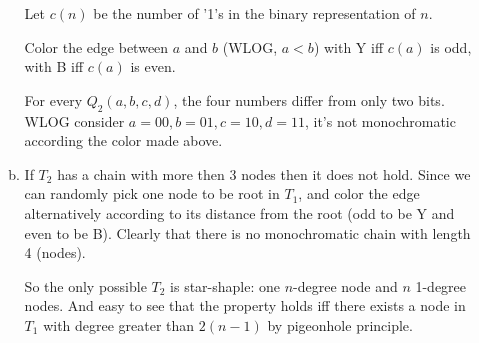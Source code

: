 \documentclass{article}
\begin{document}
\begin{itemize}
\begin{enumerate}[(a)]
                Let $c(n)$ be the number of '1's in the binary representation of $n$.

                Color the edge between $a$ and $b$ (WLOG, $a < b$) with Y iff $c(a)$ is odd, with B iff $c(a)$ is even.

                For every $Q_2(a, b, c, d)$, the four numbers differ from only two bits. WLOG consider
                $a = 00, b = 01, c = 10, d = 11$, it's not monochromatic according the color made above.

            \item
                If $T_2$ has a chain with more then 3 nodes then it does not hold.
                Since we can randomly pick one node to be root in $T_1$, and color the edge
                alternatively according to its distance from the root (odd to be Y and even to be B).
                Clearly that there is no monochromatic chain with length 4 (nodes).

                So the only possible $T_2$ is star-shaple: one $n$-degree node and $n$ 1-degree nodes.
                And easy to see that the property holds iff there exists a node in $T_1$ with degree
                greater than $2(n - 1)$ by pigeonhole principle.

        \end{enumerate}

\end{itemize}
\end{document}
